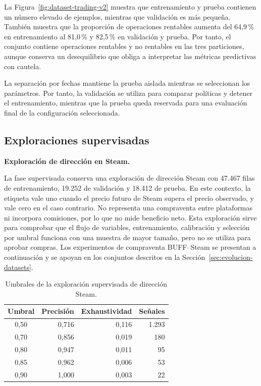 La Figura~\ref{fig:dataset-trading-v2} muestra que entrenamiento y prueba contienen un número elevado de ejemplos, mientras que validación es más pequeña. También muestra que la proporción de operaciones rentables aumenta del 64,9\,\% en entrenamiento al 81,0\,\% y 82,5\,\% en validación y prueba. Por tanto, el conjunto contiene operaciones rentables y no rentables en las tres particiones, aunque conserva un desequilibrio que obliga a interpretar las métricas predictivas con cautela.

La separación por fechas mantiene la prueba aislada mientras se seleccionan los parámetros. Por tanto, la validación se utiliza para comparar políticas y detener el entrenamiento, mientras que la prueba queda reservada para una evaluación final de la configuración seleccionada.

\subsection{Exploraciones supervisadas}

\textbf{Exploración de dirección en Steam.}

La fase supervisada conserva una exploración de dirección Steam con 47.467 filas de entrenamiento, 19.252 de validación y 18.412 de prueba. En este contexto, la etiqueta vale uno cuando el precio futuro de Steam supera el precio observado, y vale cero en el caso contrario. No representa una compraventa entre plataformas ni incorpora comisiones, por lo que no mide beneficio neto. Esta exploración sirve para comprobar que el flujo de variables, entrenamiento, calibración y selección por umbral funciona con una muestra de mayor tamaño, pero no se utiliza para aprobar compras. Los experimentos de compraventa BUFF--Steam se presentan a continuación y se apoyan en los conjuntos descritos en la Sección~\ref{sec:evolucion-datasets}.

\begin{table}[h]
\centering
\begin{tabular}{c r r r}
\toprule
Umbral & Precisión & Exhaustividad & Señales \\
\midrule
0,50 & 0,716 & 0,116 & 1.293 \\
0,70 & 0,856 & 0,019 & 180 \\
0,80 & 0,947 & 0,011 & 95 \\
0,85 & 0,962 & 0,006 & 53 \\
0,90 & 1,000 & 0,003 & 22 \\
\bottomrule
\end{tabular}
\caption{Umbrales de la exploración supervisada de dirección Steam.}
\label{tab:umbrales-direccion-steam}
\end{table}

